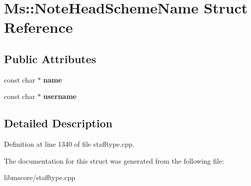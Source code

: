 \hypertarget{struct_ms_1_1_note_head_scheme_name}{}\section{Ms\+:\+:Note\+Head\+Scheme\+Name Struct Reference}
\label{struct_ms_1_1_note_head_scheme_name}
\subsection*{Public Attributes}
\begin{DoxyCompactItemize}
\item 
\mbox{\label{struct_ms_1_1_note_head_scheme_name_aec922e818db86cf7f767a2aa28bb5ef9}} 
const char $\ast$ {\bfseries name}
\item 
\mbox{\label{struct_ms_1_1_note_head_scheme_name_a854de08ec17f65c674641f552c3eed8d}} 
const char $\ast$ {\bfseries username}
\end{DoxyCompactItemize}


\subsection{Detailed Description}


Definition at line 1340 of file stafftype.\+cpp.



The documentation for this struct was generated from the following file\+:\begin{DoxyCompactItemize}
\item 
libmscore/stafftype.\+cpp\end{DoxyCompactItemize}
